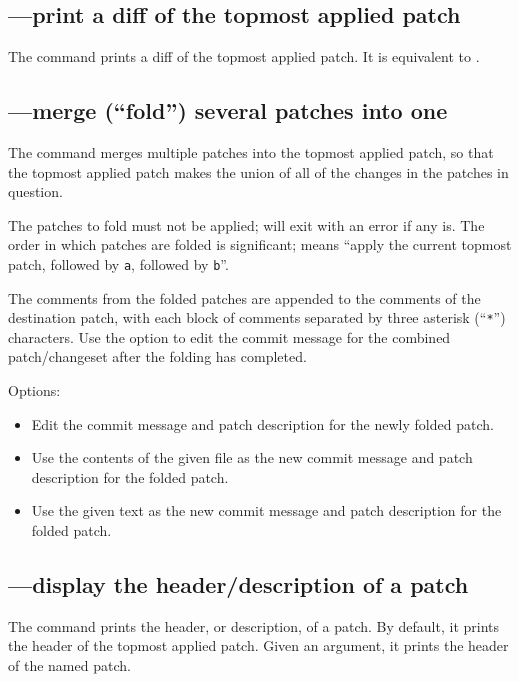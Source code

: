 \subsection{---print a diff of the topmost applied patch}

The  command prints a diff of the topmost applied patch.
It is equivalent to .

\subsection{---merge (``fold'') several patches into one}

The  command merges multiple patches into the topmost
applied patch, so that the topmost applied patch makes the union of
all of the changes in the patches in question.

The patches to fold must not be applied;  will exit with
an error if any is.  The order in which patches are folded is
significant;  means ``apply the current topmost
patch, followed by \texttt{a}, followed by \texttt{b}''.

The comments from the folded patches are appended to the comments of
the destination patch, with each block of comments separated by three
asterisk (``\texttt{*}'') characters.  Use the 
option to edit the commit message for the combined patch/changeset
after the folding has completed.

Options:
\begin{itemize}
\item[\hgopt{qfold}{-e}] Edit the commit message and patch description
  for the newly folded patch.
\item[\hgopt{qfold}{-l}] Use the contents of the given file as the new
  commit message and patch description for the folded patch.
\item[\hgopt{qfold}{-m}] Use the given text as the new commit message
  and patch description for the folded patch.
\end{itemize}

\subsection{---display the header/description of a patch}

The  command prints the header, or description, of a
patch.  By default, it prints the header of the topmost applied patch.
Given an argument, it prints the header of the named patch.


